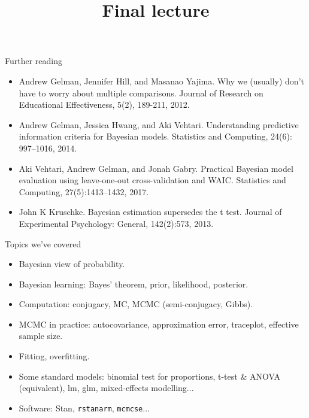 \usepackage{hyperref} %
\usepackage{booktabs} %


\usetikzlibrary{bayesnet}

\title[Final lecture]{Final lecture}









\begin{frame}{Further reading}

\begin{scriptsize}

\begin{itemize}

\item Andrew Gelman, Jennifer Hill, and Masanao Yajima. Why we (usually) don't have to worry about multiple comparisons. Journal of Research on Educational Effectiveness, 5(2), 189-211, 2012.

\item Andrew Gelman, Jessica Hwang, and Aki Vehtari. Understanding predictive
information criteria for Bayesian models. Statistics and Computing, 24(6):
997–1016, 2014.

\item Aki Vehtari, Andrew Gelman, and Jonah Gabry. Practical Bayesian model
evaluation using leave-one-out cross-validation and WAIC. Statistics and
Computing, 27(5):1413–1432, 2017.

\item John K Kruschke. Bayesian estimation supersedes the t test. Journal of Experimental
Psychology: General, 142(2):573, 2013.

\end{itemize}
\end{scriptsize}
\end{frame}

\begin{frame}{Topics we've covered}

\begin{itemize}
\item Bayesian view of probability.
\item Bayesian learning: Bayes' theorem, prior, likelihood, posterior.
\item Computation: conjugacy, MC, MCMC (semi-conjugacy, Gibbs).
\item MCMC in practice: autocovariance, approximation error, traceplot, effective sample size.
\item Fitting, overfitting.
\item Some standard models: binomial test for proportions, t-test \& ANOVA (equivalent), lm, glm, mixed-effects modelling...
\item Software: Stan, \texttt{rstanarm}, \texttt{mcmcse}...
\end{itemize}

\end{frame}


